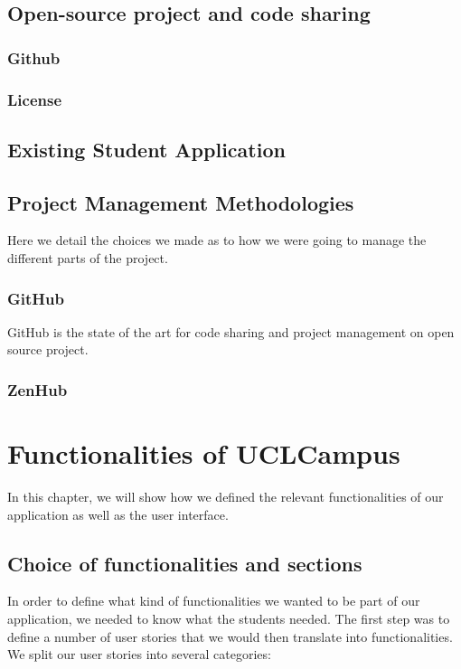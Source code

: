 \documentclass[11pt, a4paper]{report}
\begin{document}
\section{Open-source project and code sharing}

\subsection{Github}

\subsection{License}

\section{Existing Student Application}

\section{Project Management Methodologies}

Here we detail the choices we made as to how we were going to manage the different parts of the project.
\subsection{GitHub}
GitHub is the state of the art for code sharing and project management on open source project.   
\subsection{ZenHub}


\chapter{Functionalities of UCLCampus}

In this chapter, we will show how we defined the relevant functionalities of our application as well as the user interface.

\section{Choice of functionalities and sections}


In order to define what kind of functionalities we wanted to be part of our application, we needed to know what the students needed. The first step was to define a number of user stories that we would then translate into functionalities.\\ 
We split our user stories into several categories:
\end{document}
